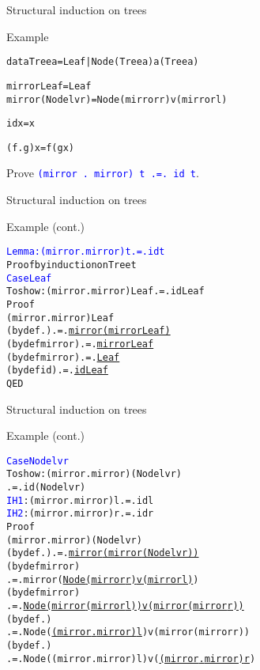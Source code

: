 \documentclass{beamer}
\def\code#1{\texttt{\frenchspacing#1}}
\begin{document}
\begin{frame}[fragile]{Structural induction on trees}

\begin{exampleblock}{Example}
\begin{alltt}
data Tree a = Leaf | Node (Tree a) a (Tree a)\pause

mirror Leaf = Leaf
mirror (Node l v r) = Node (mirror r) v (mirror l)

id x = x

(f . g) x = f (g x)
\end{alltt}

\pause

Prove \textcolor{blue}{\code{(mirror . mirror) t .=. id t}}.
\end{exampleblock}

\end{frame}

\begin{frame}[fragile]{Structural induction on trees}

\begin{exampleblock}{Example (cont.)}
\small\begin{alltt}
\textcolor{blue}{Lemma: (mirror . mirror) t .=. id t}\pause
Proof by induction on Tree t\pause
\textcolor{blue}{Case Leaf}\pause
  To show: (mirror . mirror) Leaf .=. id Leaf
  Proof
                        (mirror . mirror) Leaf\pause
    (by def .)      .=. \underline{mirror (mirror Leaf)}\pause
    (by def mirror) .=. \underline{mirror Leaf}\pause
    (by def mirror) .=. \underline{Leaf}\pause
    (by def id)     .=. \underline{id Leaf}
  QED
\end{alltt}\normalsize
\end{exampleblock}

\end{frame}

\begin{frame}[fragile]{Structural induction on trees}

\begin{exampleblock}{Example (cont.)}
\small\begin{alltt}
\textcolor{blue}{Case Node l v r}\pause
  To show: (mirror . mirror) (Node l v r)
           .=. id (Node l v r)\pause
  \textcolor{blue}{IH1}:     (mirror . mirror) l .=. id l
  \textcolor{blue}{IH2}:     (mirror . mirror) r .=. id r
  Proof
                        (mirror . mirror) (Node l v r)\pause
    (by def .)      .=. \underline{mirror (mirror (Node l v r))}\pause
    (by def mirror)
    .=. mirror (\underline{Node (mirror r) v (mirror l)})\pause
    (by def mirror)
    .=. \underline{Node (mirror (mirror l)) v (mirror (mirror r))}\pause
    (by def .)
    .=. Node (\underline{{(mirror . mirror) l}}) v (mirror (mirror r))\pause
    (by def .)
    .=. Node ((mirror . mirror) l) v (\underline{(mirror . mirror) r})
\end{alltt}\normalsize
\end{exampleblock}

\end{frame}
\end{document}
